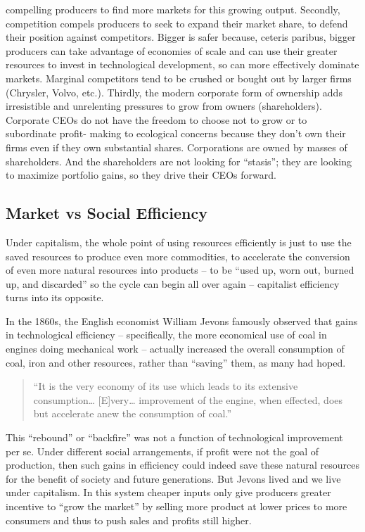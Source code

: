 \documentclass[
]{book}
\begin{document}
\begin{enumerate}
  compelling producers to find more markets for this growing output. Secondly,
  competition compels producers to seek to expand their market share, to defend their
  position against competitors. Bigger is safer because, ceteris paribus, bigger
  producers can take advantage of economies of scale and can use their greater
  resources to invest in technological development, so can more effectively dominate
  markets. Marginal competitors tend to be crushed or bought out by larger firms
  (Chrysler, Volvo, etc.). Thirdly, the modern corporate form of ownership adds
  irresistible and unrelenting pressures to grow from owners (shareholders). Corporate
  CEOs do not have the freedom to choose not to grow or to subordinate profit-
  making to ecological concerns because they don't own their firms even if they own
  substantial shares. Corporations are owned by masses of shareholders. And the
  shareholders are not looking for ``stasis''; they are looking to maximize portfolio
  gains, so they drive their CEOs forward.
\end{enumerate}

\hypertarget{market-vs-social-efficiency}{%
\subsection{Market vs Social Efficiency}\label{market-vs-social-efficiency}}

Under capitalism, the whole point of
using resources efficiently is just to use the saved resources to produce even more
commodities, to accelerate the conversion of even more natural resources into
products -- to be ``used up, worn out, burned up, and discarded'' so the cycle can
begin all over again -- capitalist efficiency turns into its opposite.

In the 1860s, the
English economist William Jevons famously observed that gains in technological
efficiency -- specifically, the more economical use of coal in engines doing
mechanical work -- actually increased the overall consumption of coal, iron and
other resources, rather than ``saving'' them, as many had hoped.

\begin{quote}
``It is the very economy of its use which leads to its extensive
consumption\ldots{} {[}E{]}very\ldots{} improvement of the engine, when
effected, does but accelerate anew the consumption of coal.''
\end{quote}

This ``rebound'' or ``backfire'' was not a function of technological improvement per
se. Under different social arrangements, if profit were not the goal of production,
then such gains in efficiency could indeed save these natural resources for the
benefit of society and future generations. But Jevons lived and we live under
capitalism. In this system cheaper inputs only give producers greater incentive to
``grow the market'' by selling more product at lower prices to more consumers and
thus to push sales and profits still higher.
\end{document}
